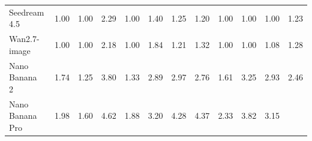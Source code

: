 \begin{table}[t]
{\begin{tabular}{l|cccccccccc|c}
            \midrule

            Seedream 4.5~\cite{seedream2025seedream}
            & 1.00 & 1.00 & 2.29 & 1.00 & 1.40 & 1.25 & 1.20 & 1.00 & 1.00 & 1.00
            & \cellcolor[HTML]{C8C8C8}1.23 \\

            Wan2.7-image~\cite{nanobananapro}
            & 1.00 & 1.00 & 2.18 & 1.00 & 1.84 & 1.21 & 1.32 & 1.00 & 1.00 & 1.08
            & \cellcolor[HTML]{C8C8C8} 1.28  \\
           
            Nano Banana 2~\cite{gemini3pro}
            & 1.74 & 1.25 & 3.80 & 1.33 & 2.89 & 2.97 & 2.76 & 1.61 & 3.25 & 2.93
            & \cellcolor[HTML]{C8C8C8} 2.46  \\

            Nano Banana Pro~\cite{nanobananapro}
            & 1.98 & 1.60 & 4.62 & 1.88 & 3.20 & 4.28 & 4.37 & 2.33 & 3.82 & 3.15
            & \cellcolor[HTML]{C8C8C8}{\color[HTML]{319B62}\textbf{3.16}} \\

  

            \bottomrule
        \end{tabular}%
    }
    \vspace{-1.0em}
\end{table}
